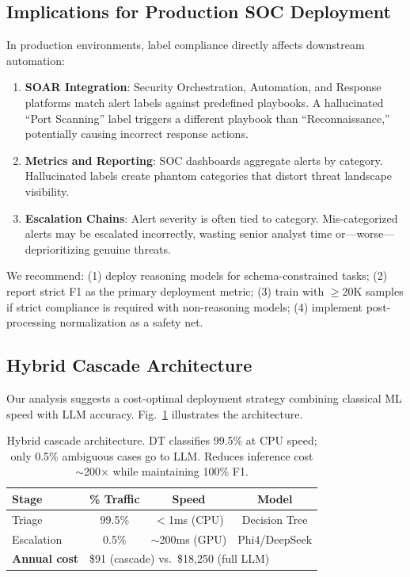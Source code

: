 \documentclass[journal]{IEEEtran}
\begin{document}
\subsection{Implications for Production SOC Deployment}
In production environments, label compliance directly affects downstream automation:
\begin{enumerate}
\item \textbf{SOAR Integration}: Security Orchestration, Automation, and Response platforms match alert labels against predefined playbooks. A hallucinated ``Port Scanning'' label triggers a different playbook than ``Reconnaissance,'' potentially causing incorrect response actions.
\item \textbf{Metrics and Reporting}: SOC dashboards aggregate alerts by category. Hallucinated labels create phantom categories that distort threat landscape visibility.
\item \textbf{Escalation Chains}: Alert severity is often tied to category. Mis-categorized alerts may be escalated incorrectly, wasting senior analyst time or---worse---deprioritizing genuine threats.
\end{enumerate}

We recommend: (1) deploy reasoning models for schema-constrained tasks; (2) report strict F1 as the primary deployment metric; (3) train with $\geq$20K samples if strict compliance is required with non-reasoning models; (4) implement post-processing normalization as a safety net.

\subsection{Hybrid Cascade Architecture}
Our analysis suggests a cost-optimal deployment strategy combining classical ML speed with LLM accuracy. Fig.~\ref{fig:cascade} illustrates the architecture.

\begin{table}[t]
\centering
\caption{Hybrid cascade architecture. DT classifies 99.5\% at CPU speed; only 0.5\% ambiguous cases go to LLM. Reduces inference cost $\sim$200$\times$ while maintaining 100\% F1.}
\label{fig:cascade}
\begin{tabular}{lccc}
\toprule
\textbf{Stage} & \textbf{\% Traffic} & \textbf{Speed} & \textbf{Model} \\
\midrule
Triage & 99.5\% & $<$1ms (CPU) & Decision Tree \\
Escalation & 0.5\% & $\sim$200ms (GPU) & Phi4/DeepSeek \\
\midrule
\textbf{Annual cost} & \multicolumn{3}{l}{\$91 (cascade) vs.\ \$18,250 (full LLM)} \\
\bottomrule
\end{tabular}
\end{table}
\end{document}
